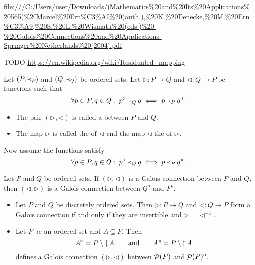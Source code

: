 \url{file:///C:/Users/user/Downloads/(Mathematics%20and%20Its%20Applications%20565)%20Marcel%20Ern%C3%A9%20(auth.),%20K.%20Denecke,%20M.%20Ern%C3%A9,%20S.%20L.%20Wismath%20(eds.)%20-%20Galois%20Connections%20and%20Applications-Springer%20Netherlands%20(2004).pdf}

TODO \url{https://en.wikipedia.org/wiki/Residuated_mapping}

\begin{definition}
Let $\left( P,\Yleft_P \right)$ and $\left( Q,\Yleft_Q \right)$ be ordered sets. Let $\triangleright: P\to Q$ and $\triangleleft: Q \to P$ be functions such that
\[ \forall p\in P, q\in Q: \; p^\triangleright \Yleft_Q q \iff p \Yleft_P q^\triangleleft. \]
\begin{itemize}
\item The pair $(\triangleright, \triangleleft)$ is called a  between $P$ and $Q$.
\item The map $\triangleright$ is called the  of $\triangleleft$ and the map $\triangleleft$ the  of $\triangleright$.
\end{itemize}
Now assume the functions satisfy
\[ \forall p\in P, q\in Q: \; p^\triangleright \Yleft_Q q \iff p \Yleft_P q^\triangleleft. \]
\end{definition}

\begin{lemma}
Let $P$ and $Q$ be ordered sets. If $(\triangleright, \triangleleft)$ is a Galois connection between $P$ and $Q$, then $(\triangleleft, \triangleright)$ is a Galois connection between $Q^o$ and $P^o$.
\end{lemma}

\begin{example}
\begin{itemize}
\item Let $P$ and $Q$ be discretely ordered sets. Then $\triangleright: P\to Q$ and $\triangleleft: Q \to P$ form a Galois connection if and only if they are invertible and $\triangleright = \triangleleft^{-1}$.
\item Let $P$ be an ordered set and $A\subseteq P$. Then
\[ A^\triangleright = P\setminus \mathop{\downarrow} A \qquad \text{and} \qquad A^\triangleleft = P\setminus \mathop{\uparrow} A \]
defines a Galois connection $(\triangleright, \triangleleft)$ between $\mathop{\mathcal{P}}(P)$ and $\mathop{\mathcal{P}}(P)^o$.
\end{itemize}
\end{example}

